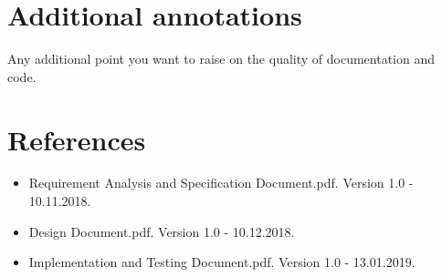 \documentclass[a4paper, hidelinks, 12pt]{report}
\begin{document}
	\chapter{Additional annotations}
	Any additional point you want to raise on the quality of documentation and code.

	\chapter{References}
	\begin{itemize}
		\item Requirement Analysis and Specification Document.pdf. Version 1.0 - 10.11.2018.
		\item Design Document.pdf. Version 1.0 - 10.12.2018.
		\item Implementation and Testing Document.pdf. Version 1.0 - 13.01.2019.
	\end{itemize}
\end{document}
